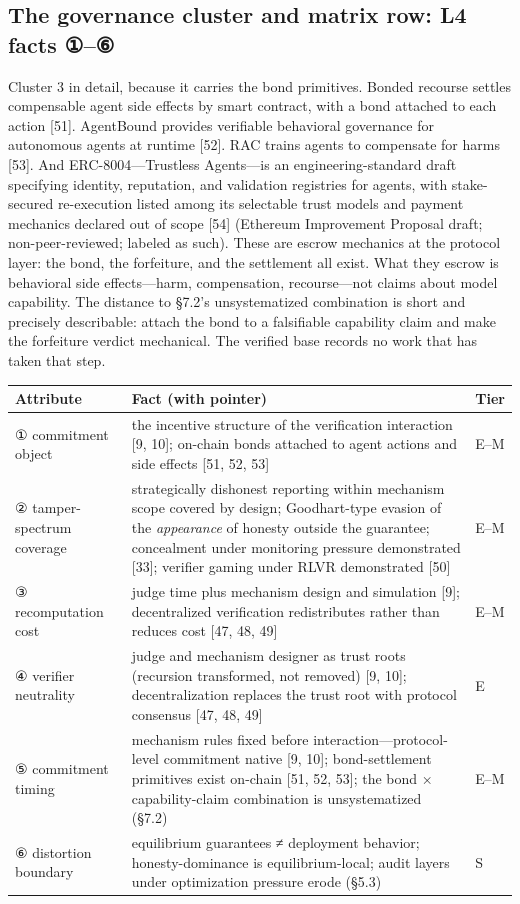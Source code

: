 \documentclass[11pt]{article}
\begin{document}
\subsection{The governance cluster and matrix row: L4 facts ①–⑥}
\noindent Cluster 3 in detail, because it carries the bond primitives. Bonded recourse settles compensable agent side effects by smart contract, with a bond attached to each action [51]. AgentBound provides verifiable behavioral governance for autonomous agents at runtime [52]. RAC trains agents to compensate for harms [53]. And ERC-8004—Trustless Agents—is an engineering-standard draft specifying identity, reputation, and validation registries for agents, with stake-secured re-execution listed among its selectable trust models and payment mechanics declared out of scope [54] (Ethereum Improvement Proposal draft; non-peer-reviewed; labeled as such). These are escrow mechanics at the protocol layer: the bond, the forfeiture, and the settlement all exist. What they escrow is behavioral side effects—harm, compensation, recourse—not claims about model capability. The distance to §7.2's unsystematized combination is short and precisely describable: attach the bond to a falsifiable capability claim and make the forfeiture verdict mechanical. The verified base records no work that has taken that step.\par
\begingroup\footnotesize
\noindent\begin{tabularx}{\textwidth}{@{}>{\raggedright\arraybackslash}p{} >{\raggedright\arraybackslash}X >{\raggedright\arraybackslash}p{}@{}}
\toprule
\textbf{\textbf{Attribute}} & \textbf{\textbf{Fact (with pointer)}} & \textbf{\textbf{Tier}} \\
\midrule
① commitment object & the incentive structure of the verification interaction [9, 10]; on-chain bonds attached to agent actions and side effects [51, 52, 53] & E–M \\
② tamper-spectrum coverage & strategically dishonest reporting within mechanism scope covered by design; Goodhart-type evasion of the \emph{appearance} of honesty outside the guarantee; concealment under monitoring pressure demonstrated [33]; verifier gaming under RLVR demonstrated [50] & E–M \\
③ recomputation cost & judge time plus mechanism design and simulation [9]; decentralized verification redistributes rather than reduces cost [47, 48, 49] & E–M \\
④ verifier neutrality & judge and mechanism designer as trust roots (recursion transformed, not removed) [9, 10]; decentralization replaces the trust root with protocol consensus [47, 48, 49] & E \\
⑤ commitment timing & mechanism rules fixed before interaction—protocol-level commitment native [9, 10]; bond-settlement primitives exist on-chain [51, 52, 53]; the bond × capability-claim combination is unsystematized (§7.2) & E–M \\
⑥ distortion boundary & equilibrium guarantees ≠ deployment behavior; honesty-dominance is equilibrium-local; audit layers under optimization pressure erode (§5.3) & S \\
\bottomrule
\end{tabularx}
\endgroup
\end{document}
